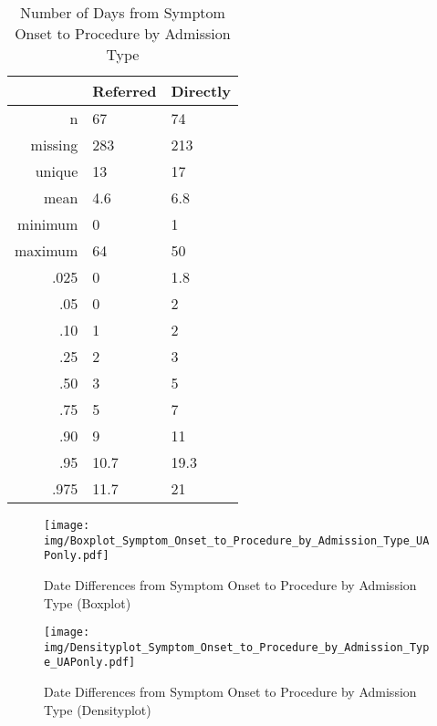 \documentclass[a4paper]{report}
\begin{document}
\begin{itemize}
{%
\begin{table}[ht]
\centering
\begin{tabular}{rll}
  \toprule
 & Referred & Directly \\ 
  \midrule
n & 67 & 74 \\ 
  missing & 283 & 213 \\ 
  unique & 13 & 17 \\ 
  mean & 4.6 & 6.8 \\ 
  minimum & 0 & 1 \\ 
  maximum & 64 & 50 \\ 
  .025 & 0 & 1.8 \\ 
  .05 & 0 & 2 \\ 
  .10 & 1 & 2 \\ 
  .25 & 2 & 3 \\ 
  .50 & 3 & 5 \\ 
  .75 & 5 & 7 \\ 
  .90 & 9 & 11 \\ 
  .95 & 10.7 & 19.3 \\ 
  .975 & 11.7 & 21 \\ 
   \bottomrule
\end{tabular}
\caption{Number of Days from Symptom Onset to Procedure by Admission Type} 
\end{table}
\begin{figure}
  \centering
  \caption{Date Differences from Symptom Onset to Procedure by Admission Type (Boxplot)}
  \label{Boxplot: Date Differences from Symptom Onset to Procedure by Admission Type}
\texttt{[image: img/Boxplot\_Symptom\_Onset\_to\_Procedure\_by\_Admission\_Type\_UAPonly.pdf]}\end{figure}


\begin{figure}
  \centering
  \caption{Date Differences from Symptom Onset to Procedure by Admission Type (Densityplot)}
  \label{Density: Date Differences from Symptom Onset to Procedure by Admission Type}
\texttt{[image: img/Densityplot\_Symptom\_Onset\_to\_Procedure\_by\_Admission\_Type\_UAPonly.pdf]}\end{figure}


\clearpage

}
\end{itemize}
\end{document}
